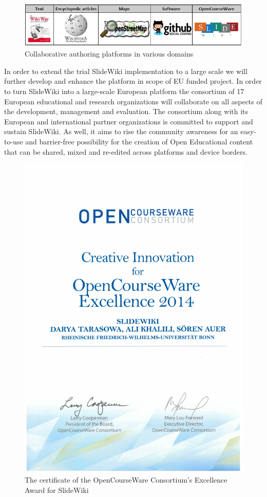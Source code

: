 \documentclass[ngerman,UKenglish,table]{scrbook}
\begin{document}
\begin{figure}
\centering
\includegraphics[width=\columnwidth]{images/filled_spot.png}
\caption{Collaborative authoring platforms in various domains}
\label{fig:slidewiki_place_2}
\end{figure}

In order to extend the trial SlideWiki implementation to a large scale we will further develop and enhance the platform in scope of EU funded project.
In order to turn SlideWiki into a large-scale European platform the consortium of 17 European educational and research organizations will collaborate on all aspects of the development, management and evaluation. 
The consortium along with its European and international partner organizations is committed to support and sustain SlideWiki.
As well, it aims to rise the community awareness for an easy-to-use and barrier-free possibility for the creation of Open Educational content that can be shared, mixed and re-edited across platforms and device borders.

\begin{figure}
\centering
\includegraphics[width=\columnwidth]{images/award.jpg}
\caption{The certificate of the OpenCourseWare Consortium’s Excellence Award for SlideWiki}
\label{fig:ocw_global_award}
\end{figure}
\end{document}
